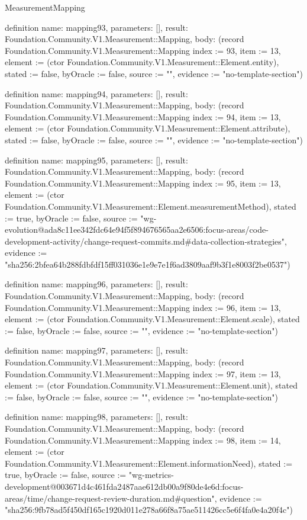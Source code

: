 \begin{lexlean}{MeasurementMapping}
\begin{semanticmodule}
definition{
  name: mapping93,
  parameters: [],
  result: Foundation.Community.V1.Measurement::Mapping,
  body: (record Foundation.Community.V1.Measurement::Mapping {index := 93, item := 13, element := (ctor Foundation.Community.V1.Measurement::Element.entity), stated := false, byOracle := false, source := "", evidence := "no-template-section"})
}

definition{
  name: mapping94,
  parameters: [],
  result: Foundation.Community.V1.Measurement::Mapping,
  body: (record Foundation.Community.V1.Measurement::Mapping {index := 94, item := 13, element := (ctor Foundation.Community.V1.Measurement::Element.attribute), stated := false, byOracle := false, source := "", evidence := "no-template-section"})
}

definition{
  name: mapping95,
  parameters: [],
  result: Foundation.Community.V1.Measurement::Mapping,
  body: (record Foundation.Community.V1.Measurement::Mapping {index := 95, item := 13, element := (ctor Foundation.Community.V1.Measurement::Element.measurementMethod), stated := true, byOracle := false, source := "wg-evolution@ada8c11ee342fdc64e94f5f894676565aa2e6506:focus-areas/code-development-activity/change-request-commits.md#data-collection-strategies", evidence := "sha256:2bfea64b288fdbfdf15ff031036e1e9e7e1f6ad3809aaf9b3f1e8003f2be0537"})
}

definition{
  name: mapping96,
  parameters: [],
  result: Foundation.Community.V1.Measurement::Mapping,
  body: (record Foundation.Community.V1.Measurement::Mapping {index := 96, item := 13, element := (ctor Foundation.Community.V1.Measurement::Element.scale), stated := false, byOracle := false, source := "", evidence := "no-template-section"})
}

definition{
  name: mapping97,
  parameters: [],
  result: Foundation.Community.V1.Measurement::Mapping,
  body: (record Foundation.Community.V1.Measurement::Mapping {index := 97, item := 13, element := (ctor Foundation.Community.V1.Measurement::Element.unit), stated := false, byOracle := false, source := "", evidence := "no-template-section"})
}

definition{
  name: mapping98,
  parameters: [],
  result: Foundation.Community.V1.Measurement::Mapping,
  body: (record Foundation.Community.V1.Measurement::Mapping {index := 98, item := 14, element := (ctor Foundation.Community.V1.Measurement::Element.informationNeed), stated := true, byOracle := false, source := "wg-metrics-development@003671d4c461fda2487aae612db00a9f80de4e6d:focus-areas/time/change-request-review-duration.md#question", evidence := "sha256:9fb78ad5f450df165c1920d011e278a66f8a75ae511426cc5e6f4fa0e4a20f4c"})
}


\end{semanticmodule}
\end{lexlean}
